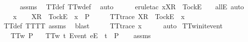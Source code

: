 \ \ \ \ \isamarkupfalse%
\ assms{\isacharparenleft}{}{\isacharparenright}\ \isamarkupfalse%
\ TT{\isacharunderscore}def\ TT{}w{\isacharunderscore}def\ \isamarkupfalse%
\ auto\isanewline
\ \ \ \ \isamarkupfalse%
\ {\isacharparenleft}erule{\isacharunderscore}tac\ x{\isacharequal}{\isachardoublequoteopen}{\isacharbrackleft}X{\isacharbrackright}\isactrlsub R\ {\isacharhash}\ {\isacharbrackleft}Tock{\isacharbrackright}\isactrlsub E\ {\isacharhash}\ {\isasymrho}{\isachardoublequoteclose}\ \ allE{\isacharcomma}\ auto{\isacharparenright}\isanewline
{}\isamarkupfalse%
\isanewline
\ \ \isamarkupfalse%
\ x\isanewline
\ \ \isamarkupfalse%
\ {\isachardoublequoteopen}{\isacharbrackleft}X{\isacharbrackright}\isactrlsub R\ {\isacharhash}\ {\isacharbrackleft}Tock{\isacharbrackright}\isactrlsub E\ {\isacharhash}\ x\ {\isasymin}\ P{\isachardoublequoteclose}\isanewline
\ \ \isamarkupfalse%
\ \isamarkupfalse%
\ {\isachardoublequoteopen}TT{}{\isacharunderscore}trace\ {\isacharparenleft}{\isacharbrackleft}X{\isacharbrackright}\isactrlsub R\ {\isacharhash}\ {\isacharbrackleft}Tock{\isacharbrackright}\isactrlsub E\ {\isacharhash}\ x{\isacharparenright}{\isachardoublequoteclose}\isanewline
\ \ \ \ \isamarkupfalse%
\ TT{}{\isacharunderscore}def\ TT{\isacharunderscore}TT{}\ assms{\isacharparenleft}{}{\isacharparenright}\ \isamarkupfalse%
\ blast\isanewline
\ \ \isamarkupfalse%
\ \isamarkupfalse%
\ {\isachardoublequoteopen}TT{}{\isacharunderscore}trace\ x{\isachardoublequoteclose}\isanewline
\ \ \ \ \isamarkupfalse%
\ auto\isanewline
{}\isamarkupfalse%
%
\endisatagproof
{\isafoldproof}%
%
\isadelimproof
\isanewline
%
\endisadelimproof
\isanewline
{}\isamarkupfalse%
\ TT{}w{\isacharunderscore}init{\isacharunderscore}event{\isacharcolon}\isanewline
\ \ \ {\isachardoublequoteopen}TT{}w\ P{\isachardoublequoteclose}\isanewline
\ \ \ {\isachardoublequoteopen}TT{}w\ {\isacharbraceleft}t{\isachardot}\ {\isacharbrackleft}Event\ e{\isacharbrackright}\isactrlsub E\ {\isacharhash}\ t\ {\isasymin}\ P{\isacharbraceright}{\isachardoublequoteclose}\isanewline
%
\isadelimproof
\ \ %
\endisadelimproof
%
\isatagproof
{}\isamarkupfalse%
\ assms\ \isamarkupfalse%
